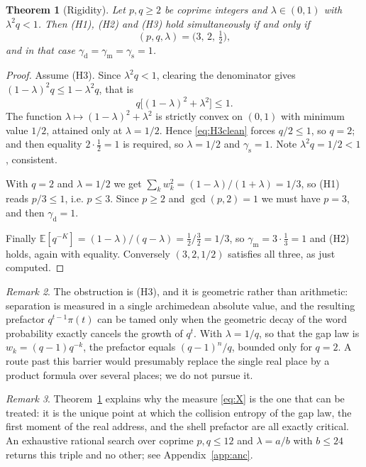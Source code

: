\documentclass[11pt,reqno]{amsart}
\theoremstyle{plain}
\newtheorem{theorem}{Theorem}[section]
\theoremstyle{definition}
\theoremstyle{remark}
\newtheorem{remark}[theorem]{Remark}
\newcommand{\E}{\mathbb{E}}
\begin{document}
\begin{theorem}[Rigidity]\label{thm:rigidity}
Let $p,q\ge2$ be coprime integers and $\lambda\in(0,1)$ with
$\lambda^2q<1$. Then \textup{(H1)}, \textup{(H2)} and \textup{(H3)} hold
simultaneously if and only if
\[
(p,q,\lambda)=\bigl(3,\,2,\,\tfrac12\bigr),
\]
and in that case
$\gamma_{\mathrm{d}}=\gamma_{\mathrm{m}}=\gamma_{\mathrm{s}}=1$.
\end{theorem}

\begin{proof}
Assume \textup{(H3)}. Since $\lambda^2q<1$, clearing the denominator gives
$(1-\lambda)^2q\le1-\lambda^2q$, that is
\begin{equation}
q\bigl[(1-\lambda)^2+\lambda^2\bigr]\le1 .
\label{eq:H3clean}
\end{equation}
The function $\lambda\mapsto(1-\lambda)^2+\lambda^2$ is strictly convex on
$(0,1)$ with minimum value $1/2$, attained only at $\lambda=1/2$. Hence
\eqref{eq:H3clean} forces $q/2\le1$, so $q=2$; and then equality
$2\cdot\frac12=1$ is required, so $\lambda=1/2$ and
$\gamma_{\mathrm{s}}=1$. Note $\lambda^2q=1/2<1$, consistent.

With $q=2$ and $\lambda=1/2$ we get
$\sum_kw_k^2=(1-\lambda)/(1+\lambda)=1/3$, so \textup{(H1)} reads
$p/3\le1$, i.e. $p\le3$. Since $p\ge2$ and $\gcd(p,2)=1$ we must have
$p=3$, and then $\gamma_{\mathrm{d}}=1$.

Finally $\E[q^{-K}]=(1-\lambda)/(q-\lambda)=\tfrac12/\tfrac32=1/3$, so
$\gamma_{\mathrm{m}}=3\cdot\tfrac13=1$ and \textup{(H2)} holds, again with
equality. Conversely $(3,2,1/2)$ satisfies all three, as just computed.
\end{proof}

\begin{remark}
The obstruction is \textup{(H3)}, and it is geometric rather than
arithmetic: separation is measured in a single archimedean absolute value,
and the resulting prefactor $q^{t-1}\pi(t)$ can be tamed only when the
geometric decay of the word probability exactly cancels the growth of
$q^{t}$. With $\lambda=1/q$, so that the gap law is $w_k=(q-1)q^{-k}$, the
prefactor equals $(q-1)^n/q$, bounded only for $q=2$. A route past this
barrier would presumably replace the single real place by a product formula
over several places; we do not pursue it.
\end{remark}

\begin{remark}
Theorem~\ref{thm:rigidity} explains why the measure \eqref{eq:X} is the one
that can be treated: it is the unique point at which the collision entropy
of the gap law, the first moment of the real address, and the shell
prefactor are all exactly critical. An exhaustive rational search over
coprime $p,q\le12$ and $\lambda=a/b$ with $b\le24$ returns this triple and
no other; see Appendix~\ref{app:anc}.
\end{remark}
\end{document}
